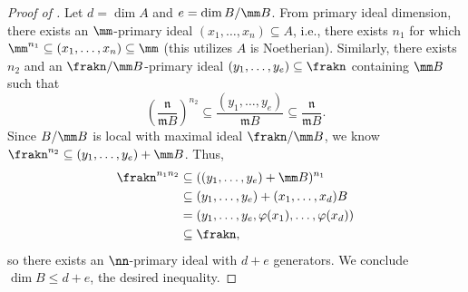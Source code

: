 \begin{proof}[Proof of ]
    Let $d=\dim A$ and $e=\dim B/\mm B$. 
    From primary ideal dimension, there exists an $\mm$-primary ideal $(x_1,\dots, x_n)\subseteq A$, i.e., there exists $n_1$ for which $\mm^{n_1} \subseteq (x_1,\dots, x_n)\subseteq \mm$ (this utilizes $A$ is Noetherian).
    Similarly, there exists $n_2$ and an $\frakn/\mm B$-primary ideal $(y_1,\dots, y_e)\subseteq \frakn$ containing $\mm B$ such that 
    \[\left(\frac{\mathfrak n}{\mathfrak mB}\right)^{n_2} \subseteq \frac{(y_1,\dots, y_e)}{\mathfrak mB}\subseteq \frac{\mathfrak n}{\mathfrak mB}.\] Since $B/\mm B$ is local with maximal ideal $\frakn /\mm B$, we know $\frakn^{n_2} \subseteq (y_1,\dots, y_e) + \mm B$. Thus, 
    \begin{align*}
    \frakn^{n_1n_2} &\subseteq ((y_1,\dots, y_e) + \mm B)^{n_1} 
    \\ 
    &\subseteq (y_1,\dots, y_e) + (x_1,\dots, x_d)B \\
    &=(y_1,\dots, y_e,\varphi(x_1),\dots, \varphi(x_d))  \\
    &\subseteq \frakn,
    \end{align*}
    so there exists an $\nn$-primary ideal with $d+e$ generators.
    We conclude $\dim B\le d+e$, the desired inequality.
    

\end{proof}
